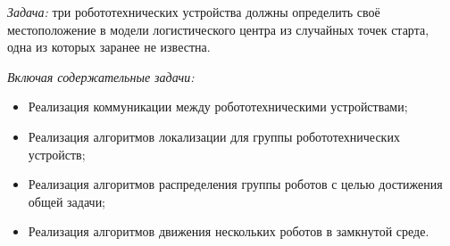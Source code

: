 
\textit{Задача:} три робототехнических устройства должны определить своё местоположение в модели логистического
центра из случайных точек старта, одна из которых заранее не известна.

\textit{Включая содержательные задачи:}
\begin{itemize}
    \item Реализация коммуникации между робототехническими устройствами;
    \item Реализация алгоритмов локализации для группы робототехнических устройств;
    \item Реализация алгоритмов распределения группы роботов с целью достижения общей задачи;
    \item Реализация алгоритмов движения нескольких роботов в замкнутой среде.
\end{itemize}